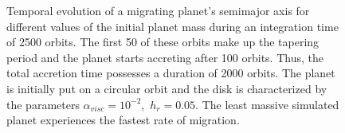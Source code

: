       \begin{figure}[h!]
        \centering
        \begin{minipage}{.5\linewidth}
          \centering
        \end{minipage}%
        \begin{minipage}{.5\linewidth}
          \centering
        \end{minipage}
        \caption{
            Temporal evolution of a migrating planet's semimajor axis for 
            different values of the initial planet mass
            during an integration time of 2500 orbits. The first 50 of 
            these orbits make up the tapering 
            period and the planet starts 
            accreting after 100 orbits. Thus, the total accretion time 
            possesses a duration of 2000 orbits. The planet is initially 
            put on a circular orbit and the disk is characterized by the 
            parameters 
            $\alpha_{visc}=10^{-2}$,\ $h_r=0.05$.
            The least massive simulated planet experiences the fastest rate of 
            migration.
        }
        \label{fig:semimajor_axis_vs_t_and_m0}
      \end{figure}


